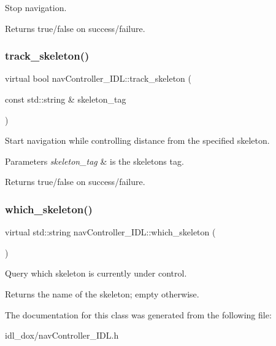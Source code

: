 Stop navigation. 

\begin{DoxyReturn}{Returns}
true/false on success/failure. 
\end{DoxyReturn}
\mbox{\label{classnavController__IDL_a09b17abbbfc5129f86de9f9bb2c5e230}} 
\subsubsection{\texorpdfstring{track\+\_\+skeleton()}{track\_skeleton()}}
{\footnotesize\ttfamily virtual bool nav\+Controller\+\_\+\+I\+D\+L\+::track\+\_\+skeleton (\begin{DoxyParamCaption}\item[{const std\+::string \&}]{skeleton\+\_\+tag }\end{DoxyParamCaption})\hspace{0.3cm}{\ttfamily [virtual]}}



Start navigation while controlling distance from the specified skeleton. 


\begin{DoxyParams}{Parameters}
{\em skeleton\+\_\+tag} & is the skeleton\textquotesingle{}s tag. \\
\hline
\end{DoxyParams}
\begin{DoxyReturn}{Returns}
true/false on success/failure. 
\end{DoxyReturn}
\mbox{\label{classnavController__IDL_ae7a1cd7d5d35831bf7851a9cf15577c8}} 
\subsubsection{\texorpdfstring{which\+\_\+skeleton()}{which\_skeleton()}}
{\footnotesize\ttfamily virtual std\+::string nav\+Controller\+\_\+\+I\+D\+L\+::which\+\_\+skeleton (\begin{DoxyParamCaption}{ }\end{DoxyParamCaption})\hspace{0.3cm}{\ttfamily [virtual]}}



Query which skeleton is currently under control. 

\begin{DoxyReturn}{Returns}
the name of the skeleton; empty otherwise. 
\end{DoxyReturn}


The documentation for this class was generated from the following file\+:\begin{DoxyCompactItemize}
\item 
idl\+\_\+dox/nav\+Controller\+\_\+\+I\+D\+L.\+h\end{DoxyCompactItemize}
